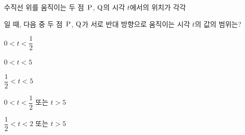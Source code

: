 수직선 위를 움직이는 두 점~$\mathrm{P}$, $\mathrm{Q}$의 시각 $t$에서의 위치가 각각 \par\smallskip{}\par\smallskip\noindent 일 때, 다음 중 두 점~$\mathrm{P}$, $\mathrm{Q}$가 서로 반대 방향으로 움직이는 시각 $t$의 값의 범위는?
\begin{choicesii}{\rule[-3ex]{0pt}{8ex}$0<t<\dfrac{1}{2}$}{\rule[-3ex]{0pt}{8ex}$0<t<5$}{\rule[-3ex]{0pt}{8ex}$\dfrac{1}{2}<t<5$}{\rule[-3ex]{0pt}{8ex}$0<t<\dfrac{1}{2}$ 또는 $t>5$}{\rule[-3ex]{0pt}{8ex}$\dfrac{1}{2}<t<2$ 또는 $t>5$}\end{choicesii}
